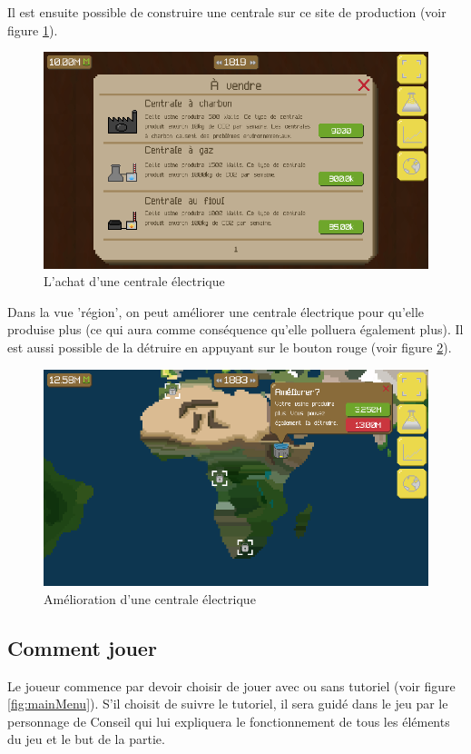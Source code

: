 \documentclass{article}
\begin{document}
        Il est ensuite possible de construire une centrale sur ce site de production (voir figure \ref{fig:buyPlant}).
        \begin{figure}[H]
                \includegraphics[width=\linewidth]{../images/buyPlant}
                \caption{L'achat d'une centrale électrique}
                \label{fig:buyPlant}
        \end{figure}
        
        
        Dans la vue 'région', on peut améliorer une centrale électrique pour qu'elle produise plus (ce qui aura comme conséquence qu'elle polluera également plus). Il est aussi possible de la détruire en appuyant sur le bouton rouge (voir figure \ref{fig:upgradePlant}).
        \begin{figure}[H]
                \includegraphics[width=\linewidth]{../images/upgradePlant}
                \caption{Amélioration d'une centrale électrique}
                \label{fig:upgradePlant}
        \end{figure}
        
        
        \subsection{Comment jouer}
        Le joueur commence par devoir choisir de jouer avec ou sans tutoriel (voir figure \ref{fig:mainMenu}).
        S'il choisit de suivre le tutoriel, il sera guidé dans le jeu par le personnage de Conseil qui lui expliquera le fonctionnement de tous les éléments du jeu et le but de la partie. 
        
\end{document}
